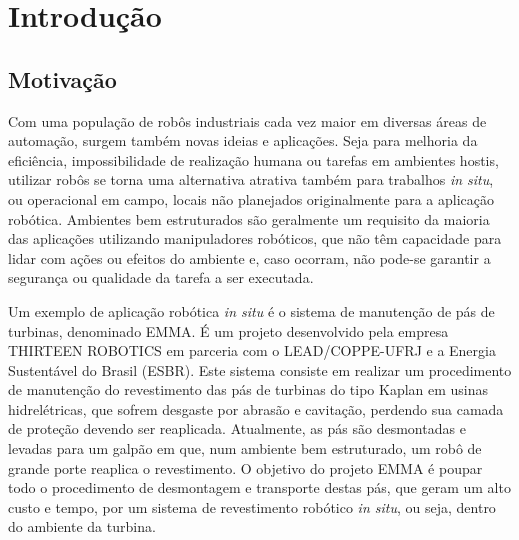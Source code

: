 \chapter{Introdução}

% 

\section{Motivação}

Com uma população de robôs industriais cada vez maior em diversas áreas de
automação, surgem também novas ideias e aplicações. Seja para melhoria da
eficiência, impossibilidade de realização humana ou tarefas em ambientes hostis,
utilizar robôs se torna uma alternativa atrativa também para trabalhos
\textit{in situ}, ou operacional em campo, locais não planejados originalmente
para a aplicação robótica.
Ambientes bem estruturados são geralmente um requisito da maioria das aplicações
utilizando manipuladores robóticos, que não têm capacidade para lidar com ações
ou efeitos do ambiente e, caso ocorram, não pode-se garantir a segurança ou
qualidade da tarefa a ser executada.

Um exemplo de aplicação robótica \textit{in situ} é o sistema de manutenção de
pás de turbinas, denominado EMMA\cite{freitas2017state}.
É um projeto desenvolvido pela empresa THIRTEEN ROBOTICS em parceria com o
LEAD/COPPE-UFRJ e a Energia Sustentável do Brasil (ESBR). Este sistema consiste
em realizar um procedimento de manutenção do revestimento das pás de turbinas do
tipo Kaplan em usinas hidrelétricas, que sofrem desgaste por abrasão e
cavitação, perdendo sua camada de proteção devendo ser reaplicada. Atualmente,
as pás são desmontadas e levadas para um galpão em que, num ambiente bem
estruturado, um robô de grande porte reaplica o revestimento.
O objetivo do projeto EMMA é poupar todo o procedimento de desmontagem e
transporte destas pás, que geram um alto custo e tempo, por um sistema de
revestimento robótico \textit{in situ}, ou seja, dentro do ambiente da turbina.

